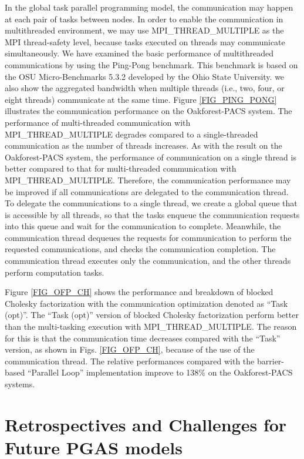 ﻿\documentclass[graybox]{svmult}
\begin{document}
In the global task parallel programming model, the communication may happen at each pair of tasks between nodes. In order to enable the communication in multithreaded environment, we may use MPI\_THREAD\_MULTIPLE as the MPI thread-safety level, because tasks executed on threads may communicate simultaneously.
We have examined the basic performance of multithreaded communications
by using the Ping-Pong benchmark. This benchmark is based on the OSU Micro-Benchmarks 5.3.2 \cite{OSU} developed by the Ohio State University.
we also show the aggregated bandwidth when multiple threads (i.e., two, four, or eight threads) communicate at the same time. Figure \ref{FIG_PING_PONG} illustrates the communication performance on the Oakforest-PACS system. The performance of multi-threaded communication with MPI\_THREAD\_MULTIPLE degrades compared to a single-threaded communication as the number of threads increases.
As with the result on the Oakforest-PACS system, the performance of communication on a single thread is better compared to that for multi-threaded communication with MPI\_THREAD\_MULTIPLE.
Therefore, the communication performance may be improved if all communications are delegated to the communication thread. To delegate the communications to a single thread, we create a global queue that is accessible by all threads, so that the tasks enqueue the communication requests into this queue and wait for the communication to complete. Meanwhile, the communication thread dequeues the requests for communication to perform the requested communications, and checks the communication completion. The communication thread executes only the communication, and the other threads perform computation tasks.

Figure \ref {FIG_OFP_CH} shows the performance and breakdown of blocked Cholesky factorization with the communication optimization denoted as ``Task (opt)''.
The ``Task (opt)'' version of blocked Cholesky factorization perform better than the multi-tasking execution with MPI\_THREAD\_MULTIPLE.
The reason for this is that the communication time decreases compared with the ``Task'' version, as shown in Figs. \ref{FIG_OFP_CH}, because of the use of the communication thread. The relative performances compared with the barrier-based ``Parallel Loop'' implementation improve to 138\% on the Oakforest-PACS systems.

\section{Retrospectives and Challenges for Future PGAS models}
\end{document}
